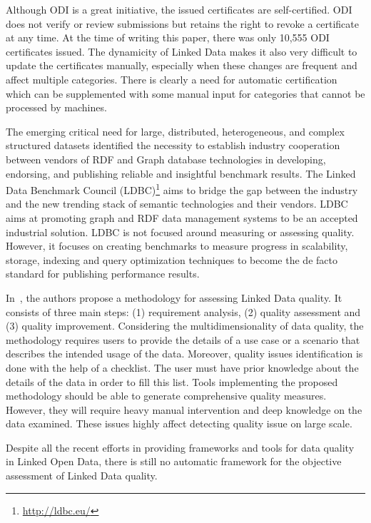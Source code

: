 Although ODI is a great initiative, the issued certificates are self-certified. ODI does not verify or review submissions but retains the right to revoke a certificate at any time. At the time of writing this paper, there was only 10,555 ODI certificates issued. The dynamicity of Linked Data  makes it also very difficult to update the certificates manually, especially when these changes are frequent and affect multiple categories. There is clearly a need for automatic certification which can be supplemented with some manual input for categories that cannot be processed by machines.

The emerging critical need for large, distributed, heterogeneous, and complex structured datasets identified the necessity to establish industry cooperation between vendors of RDF and Graph database technologies in developing, endorsing, and publishing reliable and insightful benchmark results. The Linked Data Benchmark Council (LDBC)\footnote{\url{http://ldbc.eu/}} aims to bridge the gap between the industry and the new trending stack of semantic technologies and their vendors. LDBC aims at promoting graph and RDF data management systems to be an accepted industrial solution. LDBC is not focused around measuring or assessing quality. However, it focuses on creating benchmarks to measure progress in scalability, storage, indexing and query optimization techniques to become the de facto standard for publishing performance results.

In~\cite{Anisa:LDQ:14}, the authors propose a methodology for assessing Linked Data quality. It consists of three main steps: (1) requirement analysis, (2) quality assessment and (3) quality improvement. Considering the multidimensionality of data quality, the methodology requires users to provide the details of a use case or a scenario that describes the intended usage of the data. Moreover, quality issues identification is done with the help of a checklist. The user must have prior knowledge about the details of the data in order to fill this list. Tools implementing the proposed methodology should be able to generate comprehensive quality measures. However, they will require heavy manual intervention and deep knowledge on the data examined. These issues highly affect detecting quality issue on large scale.

Despite all the recent efforts in providing frameworks and tools for data quality in Linked Open Data, there is still no automatic framework for the objective assessment of Linked Data quality.

